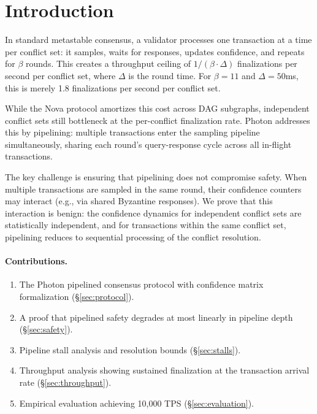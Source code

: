 \section{Introduction}

\label{sec:introduction}

In standard metastable consensus, a validator processes one transaction at a time per
conflict set: it samples, waits for responses, updates confidence, and repeats for
$\beta$ rounds. This creates a throughput ceiling of $1/(\beta \cdot \Delta)$ finalizations
per second per conflict set, where $\Delta$ is the round time. For $\beta = 11$ and
$\Delta = 50$ms, this is merely 1.8 finalizations per second per conflict set.

While the Nova protocol amortizes this cost across DAG subgraphs, independent conflict
sets still bottleneck at the per-conflict finalization rate. Photon addresses this by
pipelining: multiple transactions enter the sampling pipeline simultaneously, sharing
each round's query-response cycle across all in-flight transactions.

The key challenge is ensuring that pipelining does not compromise safety. When multiple
transactions are sampled in the same round, their confidence counters may interact
(e.g., via shared Byzantine responses). We prove that this interaction is benign: the
confidence dynamics for independent conflict sets are statistically independent, and
for transactions within the same conflict set, pipelining reduces to sequential processing
of the conflict resolution.

\paragraph{Contributions.}
\begin{enumerate}[nosep]
\item The Photon pipelined consensus protocol with confidence matrix formalization (\S\ref{sec:protocol}).
\item A proof that pipelined safety degrades at most linearly in pipeline depth (\S\ref{sec:safety}).
\item Pipeline stall analysis and resolution bounds (\S\ref{sec:stalls}).
\item Throughput analysis showing sustained finalization at the transaction arrival rate (\S\ref{sec:throughput}).
\item Empirical evaluation achieving 10,000 TPS (\S\ref{sec:evaluation}).
\end{enumerate}

